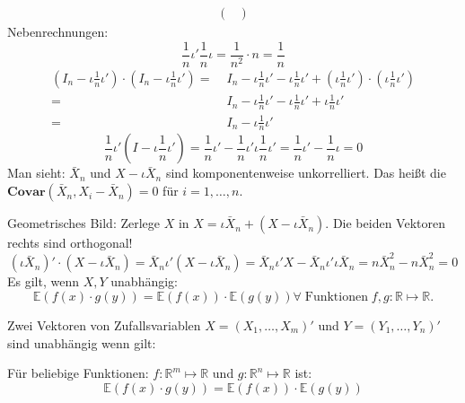 \documentclass[10pt]{article}
\newcommand{\IR}{\mathbb{R}} %
\newcommand{\EW}{\mathbb{E}} %
\newenvironment{BSP}[1][]
{\begin{Beispiel}[frametitle=#1]}{\end{Beispiel}}
\begin{document}
\begin{BSP}[Beispiel 3.0.1 (komponentenweise Unkorreliertheit)]
\begin{equation*}
\begin{split}
\begin{pmatrix}
						\end{pmatrix}
					\end{split}
				\end{equation*}
				Nebenrechnungen:
				\begin{equation*}
					\frac{1}{n} \iota' \frac{1}{n} \iota = \frac{1}{n^2} \cdot n = \frac{1}{n} 
				\end{equation*}
				\begin{equation*}
					\begin{split}
						\left(I_n - \iota \frac{1}{n} \iota '\right) \cdot \left(I_n - \iota \frac{1}{n} \iota '\right) =& \; I_n - \iota \frac{1}{n} \iota' - \iota \frac{1}{n} \iota' + \left(\iota \frac{1}{n} \iota' \right) \cdot \left( \iota \frac{1}{n} \iota'\right)\\
						=& \;  I_n - \iota \frac{1}{n} \iota' - \iota \frac{1}{n} \iota' + \iota \frac{1}{n} \iota' \\
						=&\;  I_n - \iota \frac{1}{n} \iota'
					\end{split}
				\end{equation*}
				\begin{equation*}
					\frac{1}{n} \iota' (I-\iota \frac{1}{n} \iota') = \frac{1}{n} \iota' - \frac{1}{n} \iota'\iota \frac{1}{n} \iota' = \frac{1}{n} \iota' - \frac{1}{n} \iota = 0
				\end{equation*}
				Man sieht: $\bar{X}_n$ und $X - \iota \bar{X}_n$ sind komponentenweise unkorrelliert. Das heißt die $\textbf{Covar}(\bar{X}_n, X_i - \bar{X}_n) =0$ für $i = 1, \ldots, n$. 
				
				Geometrisches Bild: Zerlege $X$ in $X = \iota \bar{X}_n + (X - \iota \bar{X}_n)$. Die beiden Vektoren rechts sind orthogonal!
				\begin{equation*}
					(\iota \bar{X}_n)' \cdot (X-\iota \bar{X}_n) = \bar{X}_n\iota' (X-\iota\bar{X}_n) = \bar{X}_n \iota' X - \bar{X}_n \iota'\iota\bar{X}_n = n \bar{X}_n^2 - n \bar{X}_n^2 =0
				\end{equation*}
				Es gilt, wenn $X,Y$ unabhängig:
				\begin{equation*}
					\EW(f(x) \cdot g(y)) = \EW(f(x)) \cdot \EW(g(y)) \forall \; \text{Funktionen} \; f,g: \IR \mapsto \IR.
				\end{equation*}
			\end{BSP}
			\begin{Definition}
				Zwei Vektoren von Zufallsvariablen $X = (X_1, \ldots, X_m)'$ und $Y=(Y_1, \ldots, Y_n)'$ sind unabhängig wenn gilt:
				
				Für beliebige Funktionen: $f: \IR^m \mapsto \IR$ und $g: \IR^n \mapsto \IR$ ist:
				\begin{equation*}
					\EW(f(x) \cdot g(y)) = \EW(f(x)) \cdot \EW(g(y))
				\end{equation*}
			\end{Definition}
\end{document}
